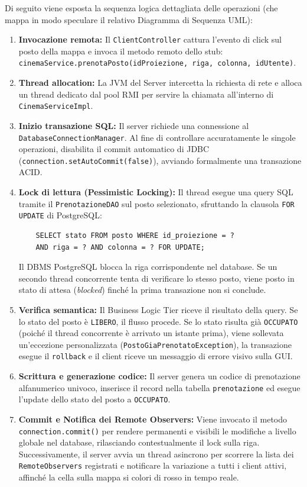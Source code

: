 \documentclass[12pt, a4paper]{article}
\begin{document}
Di seguito viene esposta la sequenza logica dettagliata delle operazioni (che mappa in modo speculare il relativo Diagramma di Sequenza UML):

\begin{enumerate}
    \item \textbf{Invocazione remota:} Il \texttt{ClientController} cattura l'evento di click sul posto della mappa e invoca il metodo remoto dello stub: \texttt{cinemaService.prenotaPosto(idProiezione, riga, colonna, idUtente)}.
    \item \textbf{Thread allocation:} La JVM del Server intercetta la richiesta di rete e alloca un thread dedicato dal pool RMI per servire la chiamata all'interno di \texttt{CinemaServiceImpl}.
    \item \textbf{Inizio transazione SQL:} Il server richiede una connessione al \texttt{DatabaseConnectionManager}. Al fine di controllare accuratamente le singole operazioni, disabilita il commit automatico di JDBC (\texttt{connection.setAutoCommit(false)}), avviando formalmente una transazione ACID.
    \item \textbf{Lock di lettura (Pessimistic Locking):} Il thread esegue una query SQL tramite il \texttt{PrenotazioneDAO} sul posto selezionato, sfruttando la clausola \texttt{FOR UPDATE} di PostgreSQL:
    \begin{verbatim}
    SELECT stato FROM posto WHERE id_proiezione = ? 
    AND riga = ? AND colonna = ? FOR UPDATE;
    \end{verbatim}
    Il DBMS PostgreSQL blocca la riga corrispondente nel database. Se un secondo thread concorrente tenta di verificare lo stesso posto, viene posto in stato di attesa (\textit{blocked}) finché la prima transazione non si conclude.
    \item \textbf{Verifica semantica:} Il Business Logic Tier riceve il risultato della query. Se lo stato del posto è \texttt{LIBERO}, il flusso procede. Se lo stato risulta già \texttt{OCCUPATO} (poiché il thread concorrente è arrivato un istante prima), viene sollevata un'eccezione personalizzata (\texttt{PostoGiaPrenotatoException}), la transazione esegue il \texttt{rollback} e il client riceve un messaggio di errore visivo sulla GUI.
    \item \textbf{Scrittura e generazione codice:} Il server genera un codice di prenotazione alfanumerico univoco, inserisce il record nella tabella \texttt{prenotazione} ed esegue l'update dello stato del posto a \texttt{OCCUPATO}.
    \item \textbf{Commit e Notifica dei Remote Observers:} Viene invocato il metodo \texttt{connection.commit()} per rendere permanenti e visibili le modifiche a livello globale nel database, rilasciando contestualmente il lock sulla riga. Successivamente, il server avvia un thread asincrono per scorrere la lista dei \texttt{RemoteObservers} registrati e notificare la variazione a tutti i client attivi, affinché la cella sulla mappa si colori di rosso in tempo reale.

\end{enumerate}
\end{document}
